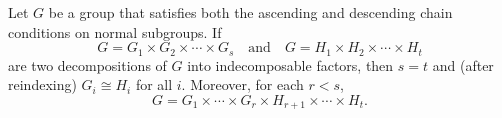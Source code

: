 Let $G$ be a group that satisfies both the ascending and descending chain conditions on normal subgroups. If
$$G = G_1 \times G_2 \times \cdots \times G_s \quad \text{and} \quad G = H_1 \times H_2 \times \cdots \times H_t$$
are two decompositions of $G$ into indecomposable factors, then $s = t$ and (after reindexing) $G_i \cong H_i$ for all $i$. Moreover, for each $r < s$,
$$G = G_1 \times \cdots \times G_r \times H_{r+1} \times \cdots \times H_t.$$
